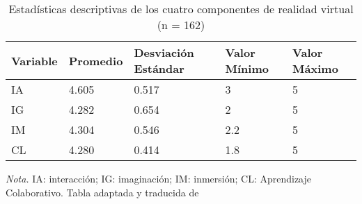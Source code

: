 \begin{table}[H]
   \caption{Estad\'isticas descriptivas de los cuatro componentes de realidad virtual (n = 162)}
   \label{tab:statsmoralvr}
   \begin{center}
      \begin{tabular}{p{2cm} p{2cm} p{2cm} p{2cm} p{2cm}}
         \hline
         Variable & Promedio & Desviación Estándar & Valor Mínimo & Valor Máximo\\
         \hline
         IA & 4.605 & 0.517 & 3 & 5\\
         IG & 4.282 & 0.654 & 2 & 5\\
         IM & 4.304 & 0.546 & 2.2 & 5\\
         CL & 4.280 & 0.414 & 1.8 & 5\\
         \hline
      \end{tabular}
   \end{center}
      \textit{Nota. }IA: interacción; IG: imaginación; IM: inmersión; CL: Aprendizaje Colaborativo. Tabla adaptada y traducida de \textcite{SHIM2023100010}
\end{table}
